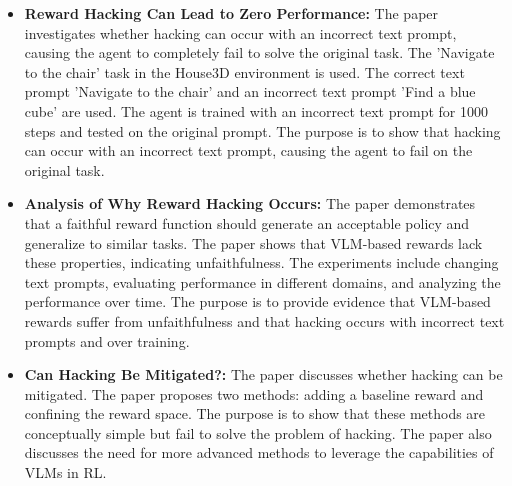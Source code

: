 \begin{itemize}
    \item \textbf{Reward Hacking Can Lead to Zero Performance:} The paper investigates whether hacking can occur with an incorrect text prompt, causing the agent to completely fail to solve the original task. The 'Navigate to the chair' task in the House3D environment is used. The correct text prompt 'Navigate to the chair' and an incorrect text prompt 'Find a blue cube' are used. The agent is trained with an incorrect text prompt for 1000 steps and tested on the original prompt. The purpose is to show that hacking can occur with an incorrect text prompt, causing the agent to fail on the original task.
    
    \item \textbf{Analysis of Why Reward Hacking Occurs:} The paper demonstrates that a faithful reward function should generate an acceptable policy and generalize to similar tasks. The paper shows that VLM-based rewards lack these properties, indicating unfaithfulness. The experiments include changing text prompts, evaluating performance in different domains, and analyzing the performance over time. The purpose is to provide evidence that VLM-based rewards suffer from unfaithfulness and that hacking occurs with incorrect text prompts and over training.
    
    \item \textbf{Can Hacking Be Mitigated?:} The paper discusses whether hacking can be mitigated. The paper proposes two methods: adding a baseline reward and confining the reward space. The purpose is to show that these methods are conceptually simple but fail to solve the problem of hacking. The paper also discusses the need for more advanced methods to leverage the capabilities of VLMs in RL.
\end{itemize}
